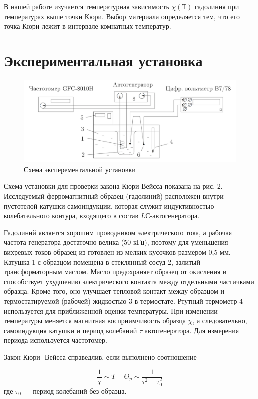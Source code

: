 \documentclass[12pt,a4paper]{article}
\begin{document}
В нашей работе изучается температурная зависимость $ \chi(Т) $ гадолиния
при температурах выше точки Кюри. Выбор материала определяется
тем, что его точка Кюри лежит в интервале комнатных температур.

\section{Экспериментальная установка} 
\begin{figure}[h!]
	\centering
	\includegraphics[width=\linewidth]{ust.png}
	\caption{Схема эксперементальной установки}
	\label{ust}
\end{figure}

Схема установки для проверки закона Кюри-Вейсса показана на рис. 2. Исследуемый ферромагнитный образец (гадолиний) расположен внутри пустотелой катушки самоиндукции, которая служит индуктивностью колебательного контура, входящего в состав $ LС $-автогенератора. 

Гадолиний является хорошим проводником электрического тока, а рабочая
частота генератора достаточно велика (50 кГц), поэтому для уменьшения
вихревых токов образец из готовлен из мелких кусочков размером 0,5 мм.
Катушка 1 с образцом помещена в стеклянный сосуд 2, залитый трансформаторным маслом. Масло предохраняет образец от окисления и способствует ухудшению электрического контакта между отдельными частичками образца. Кроме того, оно улучшает тепловой контакт между образцом и термостатируемой (рабочей) жидкостью 3 в термостате. Ртутный термометр 4 используется для приближенной оценки температуры.
При изменении температуры меняется магнитная восприимчивость образца
$ \chi $, а следовательно, самоиндукция катушки и период колебаний $ \tau $ автогенератора. Для измерения периода используется частотомер.

Закон Кюри- Вейсса справедлив, если выполнено соотношение

\begin{equation}\label{}
\dfrac{1}{\chi} \sim T - \Theta_p \sim \dfrac{1}{\tau^2 - \tau^2_0}
\end{equation}
где $ \tau_0 $ --- период колебаний без образца. 
\end{document}
